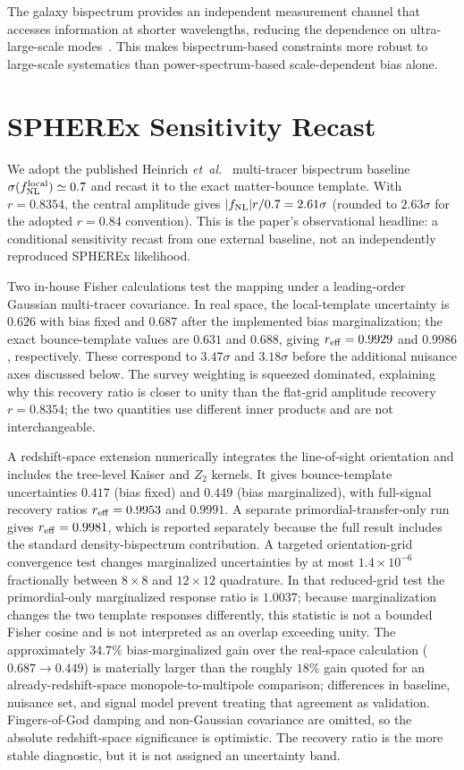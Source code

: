 \documentclass[aps,prd,twocolumn,superscriptaddress,showpacs,preprintnumbers,nofootinbib,longbibliography,floatfix]{revtex4-2}
\newcommand{\fnl}{f_{\rm NL}}
\newcommand{\etal}{\textit{et~al.}}
\begin{document}
The galaxy bispectrum provides an independent measurement channel that accesses information at shorter wavelengths, reducing the dependence on ultra-large-scale modes~\cite{Heinrich:2023}. This makes bispectrum-based constraints more robust to large-scale systematics than power-spectrum-based scale-dependent bias alone.

\section{SPHEREx Sensitivity Recast}
\label{sec:spherex}

We adopt the published Heinrich \etal~\cite{Heinrich:2023} multi-tracer bispectrum baseline $\sigma(\fnl^{\rm local})\simeq0.7$ and recast it to the exact matter-bounce template. With $r=0.8354$, the central amplitude gives $|\fnl|r/0.7=2.61\sigma$ (rounded to $2.63\sigma$ for the adopted $r=0.84$ convention). This is the paper's observational headline: a conditional sensitivity recast from one external baseline, not an independently reproduced SPHEREx likelihood.

Two in-house Fisher calculations test the mapping under a leading-order Gaussian multi-tracer covariance. In real space, the local-template uncertainty is $0.626$ with bias fixed and $0.687$ after the implemented bias marginalization; the exact bounce-template values are $0.631$ and $0.688$, giving $r_{\rm eff}=0.9929$ and $0.9986$, respectively. These correspond to $3.47\sigma$ and $3.18\sigma$ before the additional nuisance axes discussed below. The survey weighting is squeezed dominated, explaining why this recovery ratio is closer to unity than the flat-grid amplitude recovery $r=0.8354$; the two quantities use different inner products and are not interchangeable.

A redshift-space extension numerically integrates the line-of-sight orientation and includes the tree-level Kaiser and $Z_2$ kernels. It gives bounce-template uncertainties $0.417$ (bias fixed) and $0.449$ (bias marginalized), with full-signal recovery ratios $r_{\rm eff}=0.9953$ and $0.9991$. A separate primordial-transfer-only run gives $r_{\rm eff}=0.9981$, which is reported separately because the full result includes the standard density-bispectrum contribution. A targeted orientation-grid convergence test changes marginalized uncertainties by at most $1.4\times10^{-6}$ fractionally between $8\times8$ and $12\times12$ quadrature. In that reduced-grid test the primordial-only marginalized response ratio is $1.0037$; because marginalization changes the two template responses differently, this statistic is not a bounded Fisher cosine and is not interpreted as an overlap exceeding unity. The approximately $34.7\%$ bias-marginalized gain over the real-space calculation ($0.687\to0.449$) is materially larger than the roughly $18\%$ gain quoted for an already-redshift-space monopole-to-multipole comparison; differences in baseline, nuisance set, and signal model prevent treating that agreement as validation. Fingers-of-God damping and non-Gaussian covariance are omitted, so the absolute redshift-space significance is optimistic. The recovery ratio is the more stable diagnostic, but it is not assigned an uncertainty band.
\end{document}
